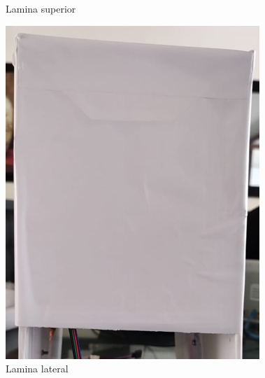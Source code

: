 \begin{figure}[ht]
\begin{minipage}[b]{0.25\linewidth}
				\caption{Lamina superior}
				\label{fig:superior}
			\end{minipage}
		\end{figure}
	
		\begin{figure}[ht]
			\centering
			\begin{minipage}[b]{0.25\linewidth}
				\centering
				\includegraphics[width=\linewidth]{Figs/302.png}
				\caption{Lamina lateral}
				\label{fig:lateral}
			\end{minipage}
			\hspace{2.5cm}
			\begin{minipage}[b]{0.25\linewidth}
				\centering

\end{minipage}
\end{figure}
